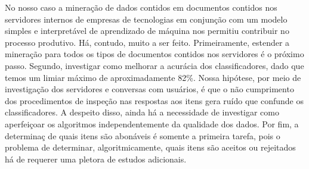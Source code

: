 \documentclass[
	12pt,				%
	openany,			%
	oneside,			%
	a4paper,			%
	english,			%
	french,				%
	spanish,			%
	brazil,				%
	]{abntex2}
\begin{document}
No nosso caso a minera\c{c}ão de dados contidos em documentos contidos nos
servidores internos de empresas de tecnologias em conjun\c{c}ão com um modelo
simples e interpretável de aprendizado de máquina nos permitiu contribuir no
processo produtivo. Há, contudo, muito a ser feito. Primeiramente, estender a
minera\c{c}ão para todos os tipos de documentos contidos nos servidores é o
próximo passo. Segundo, investigar como melhorar a acurácia dos classificadores,
dado que temos um limiar máximo de aproximadamente 82\%. Nossa hipótese, por
meio de investiga\c{c}ão dos servidores e conversas com usuários, é que o não
cumprimento dos procedimentos de inspe\c{c}ão nas respostas aos itens gera ruído
que confunde os classificadores. A despeito disso, ainda há a necessidade de
investigar como aperfei\c{c}oar os algoritmos independentemente da qualidade dos
dados. Por fim, a determina\c{c} de quais itens são abonáveis é somente a
primeira tarefa, pois o problema de determinar, algoritmicamente, quais itens
são aceitos ou rejeitados há de requerer uma pletora de estudos adicionais.







\postextual



%
%


\printindex
\end{document}
